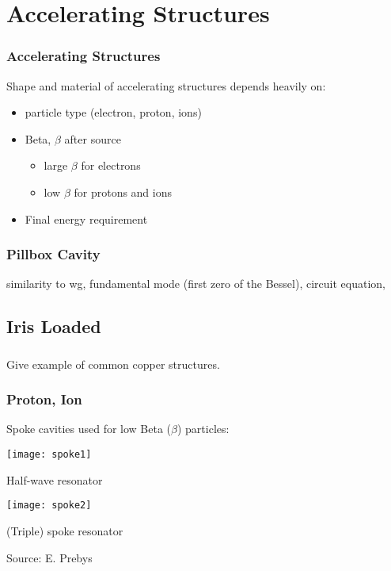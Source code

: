 \documentclass[professionalfonts,t]{beamer}
\begin{document}
\section{Accelerating Structures}
\begin{frame}
\frametitle{Accelerating Structures}
Shape and material of accelerating structures depends heavily on: 
\begin{itemize}
	\item particle type (electron, proton, ions)
	\item Beta, $\beta$ after source
	\begin{itemize}
		\item large $\beta$ for electrons
		\item low $\beta$ for protons and ions
	\end{itemize}
	\item Final energy requirement
\end{itemize}
\end{frame}

\begin{frame}
	\frametitle{Pillbox Cavity}
	similarity to wg, fundamental mode (first zero of the Bessel), 
	circuit equation, 
\end{frame}


\subsection{Iris Loaded}
\begin{frame}
	\frametitle{}
	Give example of common copper structures. 
\end{frame}

\begin{frame}
\frametitle{Proton, Ion}
Spoke cavities used for low Beta ($\beta$) particles:
\vspace{0.25em}

\centering
\begin{minipage}{0.45\textwidth}
	\centering
	\texttt{[image: spoke1]}
	
	Half-wave resonator
\end{minipage}\hspace{-1em}
\begin{minipage}{0.5\textwidth}
	\centering
	\texttt{[image: spoke2]}
	
	(Triple) spoke resonator
\end{minipage}

\vspace{1em}
\hfill Source: E. Prebys
\end{frame}
\end{document}
